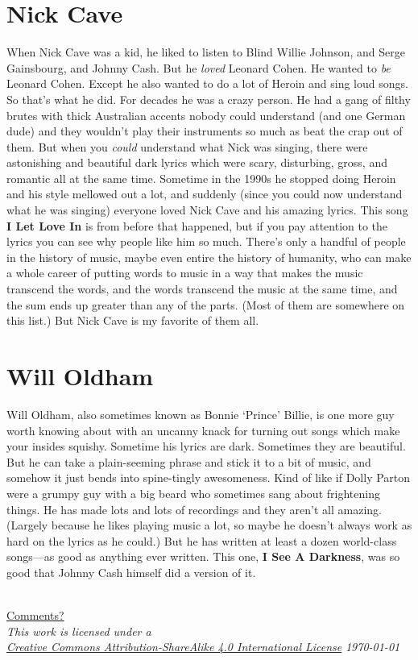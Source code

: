 \documentclass[letterpaper,single]{article}
\begin{document}
\section{Nick Cave}
When Nick Cave was a kid, he liked to listen to Blind Willie Johnson, and Serge Gainsbourg, and Johnny Cash. 
But he \emph{loved} Leonard Cohen. 
He wanted to \emph{be} Leonard Cohen. 
Except he also wanted to do a lot of Heroin and sing loud songs. 
So that's what he did. 
For decades he was a crazy person. 
He had a gang of filthy brutes with thick Australian accents nobody could understand (and one German dude) and they wouldn't play their instruments so much as beat the crap out of them. 
But when you \emph{could} understand what Nick was singing, there were astonishing and beautiful dark lyrics which were scary, disturbing, gross, and romantic all at the same time. 
Sometime in the 1990s he stopped doing Heroin and his style mellowed out a lot, and suddenly (since you could now understand what he was singing) everyone loved Nick Cave and his amazing lyrics.
This song \textbf{I Let Love In} is from before that happened, but if you pay attention to the lyrics you can see why people like him so much.
There's only a handful of people in the history of music, maybe even entire the history of humanity, who can make a whole career of putting words to music in a way that makes the music transcend the words, and the words transcend the music at the same time, and the sum ends up greater than any of the parts.
(Most of them are somewhere on this list.)
But Nick Cave is my favorite of them all.

\section{Will Oldham}
Will Oldham, also sometimes known as Bonnie `Prince' Billie, is one more guy worth knowing about with an uncanny knack for turning out songs which make your insides squishy. 
Sometime his lyrics are dark. 
Sometimes they are beautiful. 
But he can take a plain-seeming phrase and stick it to a bit of music, and somehow it just bends into spine-tingly awesomeness. 
Kind of like if Dolly Parton were a grumpy guy with a big beard who sometimes sang about frightening things.
He has made lots and lots of recordings and they aren't all amazing.
(Largely because he likes playing music a lot, so maybe he doesn't always work as hard on the lyrics as he could.) 
But he has written at least a dozen world-class songs---as good as anything ever written. This one, \textbf{I See A Darkness}, was so good that Johnny Cash himself did a version of it.
\\
\\
\begin{center}
  \small
  \href{mailto://kunstcleaver@gmail.com}{Comments?}\\
  \textit{This work is licensed under a \\\href{http://creativecommons.org/licenses/by-sa/4.0/}{Creative Commons Attribution-ShareAlike 4.0 International License}}
  \textit{\today}\\
\end{center}
\end{document}
